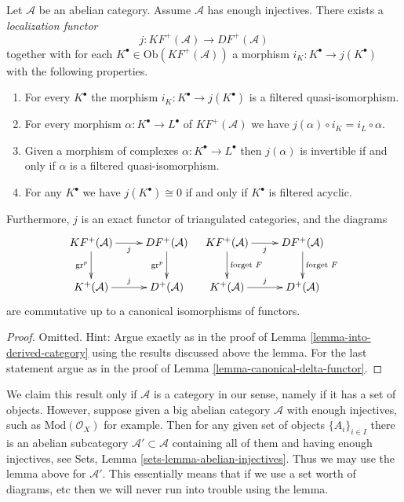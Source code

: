 \begin{lemma}
\label{lemma-filtered-localization-functor}
Let $\mathcal{A}$ be an abelian category.
Assume $\mathcal{A}$ has enough injectives.
There exists a {\it localization functor}
$$
j : KF^{+}(\mathcal{A}) \longrightarrow DF^{+}(\mathcal{A})
$$
together with for each $K^\bullet \in \text{Ob}(KF^{+}(\mathcal{A}))$
a morphism $i_K : K^\bullet \to j(K^\bullet)$ with the following properties.
\begin{enumerate}
\item For every $K^\bullet$ the morphism $i_K : K^\bullet \to j(K^\bullet)$
is a filtered quasi-isomorphism.
\item For every morphism $\alpha : K^\bullet \to L^\bullet$ of
$KF^{+}(\mathcal{A})$ we have $j(\alpha) \circ i_K = i_L \circ \alpha$.
\item Given a morphism of complexes $\alpha : K^\bullet \to L^\bullet$
then $j(\alpha)$ is invertible if and only if $\alpha$ is a
filtered quasi-isomorphism.
\item For any $K^\bullet$ we have $j(K^\bullet) \cong 0$ if and only
if $K^\bullet$ is filtered acyclic.
\end{enumerate}
Furthermore, $j$ is an exact functor of triangulated categories,
and the diagrams
$$
\xymatrix{
KF^{+}(\mathcal{A}) \ar[d]_{\text{gr}^p} \ar[r]_j &
DF^{+}(\mathcal{A}) \ar[d]_{\text{gr}^p} \\
K^{+}(\mathcal{A}) \ar[r]^j &
D^{+}(\mathcal{A})
}
\quad
\xymatrix{
KF^{+}(\mathcal{A}) \ar[d]^{\text{forget }F} \ar[r]_j &
DF^{+}(\mathcal{A}) \ar[d]^{\text{forget }F} \\
K^{+}(\mathcal{A}) \ar[r]^j &
D^{+}(\mathcal{A})
}
$$
are commutative up to a canonical isomorphisms of functors.
\end{lemma}

\begin{proof}
Omitted. Hint: Argue exactly as in the proof of
Lemma \ref{lemma-into-derived-category}
using the results discussed above the lemma.
For the last statement argue as in the proof of
Lemma \ref{lemma-canonical-delta-functor}.
\end{proof}

\begin{remark}
\label{remark-filtered-localization-big}
We claim this result only if $\mathcal{A}$ is a category in our sense,
namely if it has a set of objects. However, suppose given a big abelian
category $\mathcal{A}$ with enough injectives, such as
$\text{Mod}(\mathcal{O}_X)$ for example. Then for any given set of objects
$\{A_i\}_{i\in I}$ there is an abelian subcategory
$\mathcal{A}' \subset \mathcal{A}$ containing all of them
and having enough injectives, see
Sets, Lemma \ref{sets-lemma-abelian-injectives}.
Thus we may use the lemma above for $\mathcal{A}'$.
This essentially means that if we use a set worth of diagrams, etc 
then we will never run into trouble using the lemma.
\end{remark}


